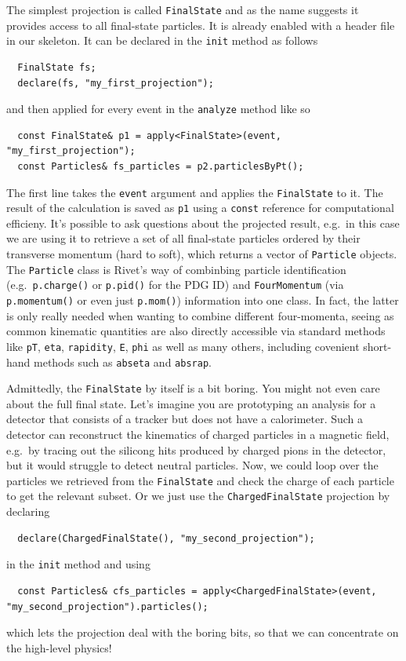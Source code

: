 \documentclass[10pt,fleqn]{scrartcl}
\theoremstyle{exstyle}
\begin{document}
The simplest projection is called 
\verb|FinalState| and as the name suggests
it provides access to all final-state particles. 
It is already enabled with a header file in our skeleton.
It can be declared in the \verb|init| method as follows
\begin{verbatim}
  FinalState fs;
  declare(fs, "my_first_projection");
\end{verbatim}
and then applied for every event in the \verb|analyze|
method like so
\begin{verbatim}
  const FinalState& p1 = apply<FinalState>(event, "my_first_projection");
  const Particles& fs_particles = p2.particlesByPt();
\end{verbatim}
The first line takes the \verb|event| argument and applies
the \verb|FinalState| to it. The result of the calculation
is saved as \verb|p1| using a \verb|const| reference
for computational efficieny. It's possible to ask questions
about the projected result, e.g.\ in this case
we are using it to retrieve a set of all final-state particles
ordered by their transverse momentum (hard to soft), which 
returns a vector of \verb|Particle| objects. The \verb|Particle|
class is Rivet's way of combinbing particle identification 
(e.g.\ \verb|p.charge()| or \verb|p.pid()| for the PDG ID)
and \verb|FourMomentum| (via \verb|p.momentum()| or even just \verb|p.mom()|) 
information into one class. 
In fact, the latter is only really needed when wanting to combine 
different four-momenta, seeing as common kinematic quantities
are also directly accessible via standard methods like
\verb|pT|, 
\verb|eta|, 
\verb|rapidity|, 
\verb|E|, 
\verb|phi| as well as many others, 
including covenient short-hand methods such as \verb|abseta| and \verb|absrap|.

Admittedly, the \verb|FinalState| by itself is a bit boring. 
You might not even care about the full final state. Let's imagine you
are prototyping an analysis for a detector that consists of a tracker
but does not have a calorimeter. Such a detector 
can reconstruct the kinematics of charged particles in
a magnetic field, e.g.\ by tracing out the silicong hits
produced by charged pions in the detector, but it would
struggle to detect neutral particles. 
Now, we could loop over the particles we retrieved
from the \verb|FinalState| and 
check the charge of each particle to get the relevant subset.
Or we just use the \verb|ChargedFinalState| projection by declaring
\begin{verbatim}
  declare(ChargedFinalState(), "my_second_projection");
\end{verbatim}
in the \verb|init| method and using
\begin{footnotesize}
\begin{verbatim}
  const Particles& cfs_particles = apply<ChargedFinalState>(event, "my_second_projection").particles();
\end{verbatim}
\end{footnotesize}
which lets the projection deal with the boring bits,
so that we can concentrate on the high-level physics!
\end{document}
